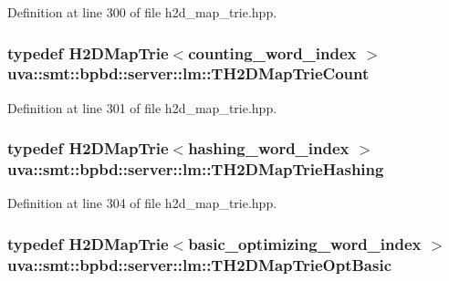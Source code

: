 Definition at line 300 of file h2d\+\_\+map\+\_\+trie.\+hpp.

\hypertarget{namespaceuva_1_1smt_1_1bpbd_1_1server_1_1lm_ad15ed56267177261838deb012dd84484}{}
\subsubsection[{T\+H2\+D\+Map\+Trie\+Count}]{\setlength{\rightskip}{0pt plus 5cm}typedef {\bf H2\+D\+Map\+Trie}$<${\bf counting\+\_\+word\+\_\+index} $>$ {\bf uva\+::smt\+::bpbd\+::server\+::lm\+::\+T\+H2\+D\+Map\+Trie\+Count}}\label{namespaceuva_1_1smt_1_1bpbd_1_1server_1_1lm_ad15ed56267177261838deb012dd84484}


Definition at line 301 of file h2d\+\_\+map\+\_\+trie.\+hpp.

\hypertarget{namespaceuva_1_1smt_1_1bpbd_1_1server_1_1lm_a3498df199048e5874c448044fc4c3145}{}
\subsubsection[{T\+H2\+D\+Map\+Trie\+Hashing}]{\setlength{\rightskip}{0pt plus 5cm}typedef {\bf H2\+D\+Map\+Trie}$<${\bf hashing\+\_\+word\+\_\+index} $>$ {\bf uva\+::smt\+::bpbd\+::server\+::lm\+::\+T\+H2\+D\+Map\+Trie\+Hashing}}\label{namespaceuva_1_1smt_1_1bpbd_1_1server_1_1lm_a3498df199048e5874c448044fc4c3145}


Definition at line 304 of file h2d\+\_\+map\+\_\+trie.\+hpp.

\hypertarget{namespaceuva_1_1smt_1_1bpbd_1_1server_1_1lm_aaad3c59cbddee8695a5b1468ac1be102}{}
\subsubsection[{T\+H2\+D\+Map\+Trie\+Opt\+Basic}]{\setlength{\rightskip}{0pt plus 5cm}typedef {\bf H2\+D\+Map\+Trie}$<${\bf basic\+\_\+optimizing\+\_\+word\+\_\+index} $>$ {\bf uva\+::smt\+::bpbd\+::server\+::lm\+::\+T\+H2\+D\+Map\+Trie\+Opt\+Basic}}\label{namespaceuva_1_1smt_1_1bpbd_1_1server_1_1lm_aaad3c59cbddee8695a5b1468ac1be102}


